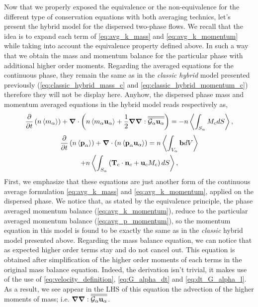 Now that we properly exposed the equivalence or the non-equivalence for the different type of conservation equations with both averaging technics, let's present the hybrid model for the dispersed two-phase flows. 
We recall that the idea is to expand each term of \ref{eq:avg_k_mass} and \ref{eq:avg_k_momentum} while taking into account the equivalence property defined above.
In such a way that we obtain the mass and momentum balance for the particular phase with additional higher order moments. 
Regarding the averaged equations for the continuous phase, they remain the same as in the \textit{classic hybrid} model presented previously (\ref{eq:classic_hybrid_mass_c} and \ref{eq:classic_hybrid_momentum_c}) therefore they will not be display here.
Anyhow, the dispersed phase mass and momentum averaged equations in the hybrid model reads respectively as, 
\begin{equation}
    \frac{\partial}{\partial t}   \left(n \left<m_\alpha\right>\right)
    + \bm{\nabla} \cdot \left(n \left<m_\alpha \textbf{u}_\alpha\right> 
    + \frac{1}{2}\bm{\nabla}\bm{\nabla} : \overline{\overline{ \mathcal{G}_\alpha\textbf{u}_\alpha}}\right) 
    = -n \left<\int_{S_\alpha} M_c d S\right>,
        \label{eq:hybrid_mass_p}
\end{equation}
\begin{multline}
    \frac{\partial}{\partial t}   \left(n \left<\textbf{p}_\alpha\right>\right)
    + \bm{\nabla} \cdot (n \left<\textbf{p}_\alpha \textbf{u}_\alpha\right>)
    = n \left<\int_{V_\alpha} \textbf{b} dV\right>\\
    + n \left<\int_{S_\alpha} \left(\textbf{T}_c  \cdot \textbf{n}_c  + \textbf{u}_c M_c \right) dS\right>,
    \label{eq:hybrid_momentum_p}
\end{multline}
First, we emphasize that these equations are just another form of the continuous average formulation \ref{eq:avg_k_mass} and \ref{eq:avg_k_momentum}, applied on the dispersed phase. 
We notice that, as stated by the equivalence principle, the phase averaged momentum balance (\ref{eq:avg_k_momentum}), reduce to the particular averaged momentum balance (\ref{eq:avg_p_momentum}), so the momentum equation in this model is found to be exactly the same as in the \textit{classic} hybrid model presented above. 
Regarding the mass balance equation, we can notice that as expected higher order terms stay and do not cancel out.
This equation is obtained after simplification of the higher order moments of each terms in the original mass balance equation. 
Indeed, the derivation isn't trivial, it makes use of the use of \ref{eq:velocity_definition}, \ref{eq:G_alpha_dt} and \ref{eq:dt_G_alpha_l}.
As a result, we see appear in the LHS of this equation the advection of the higher moments of mass; i.e. $\bm{\nabla} \bm{\nabla} : \overline{\overline{ \mathcal{G}_\alpha\textbf{u}_\alpha}}$. 
